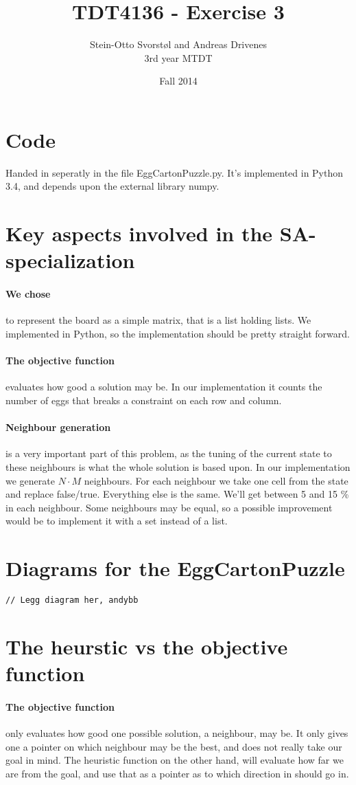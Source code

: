 \documentclass[11pt,a4paper]{article}
\author{Stein-Otto Svorstøl and Andreas Drivenes
\\3rd year MTDT}
\title{TDT4136 - Exercise 3}
\date{Fall 2014}
\begin{document}
\maketitle
\section{Code}
Handed in seperatly in the file EggCartonPuzzle.py. It's implemented in Python 3.4, and depends upon the external library numpy.

\section{Key aspects involved in the SA-specialization}
\paragraph{We chose} to represent the board as a simple matrix, that is a list holding lists. We implemented in Python, so the implementation should be pretty straight forward.

\paragraph{The objective function} evaluates how good a solution may be. In our implementation it counts the number of eggs that breaks a constraint on each row and column.

\paragraph{Neighbour generation} is a very important part of this problem, as the tuning of the current state to these neighbours is what the whole solution is based upon. In our implementation we generate \begin{math}N\cdot M\end{math} neighbours. For each neighbour we take one cell from the state and replace false/true. Everything else is the same. We'll get between 5 and 15 \% in each neighbour. Some neighbours may be equal, so a possible improvement would be to implement it with a set instead of a list.
\section{Diagrams for the EggCartonPuzzle}
\begin{lstlisting}
// Legg diagram her, andybb
\end{lstlisting}

\section{The heurstic vs the objective function}
\paragraph{The objective function} only evaluates how good one possible solution, a neighbour, may be. It only gives one a pointer on which neighbour may be the best, and does not really take our goal in mind. The heuristic function on the other hand, will evaluate how far we are from the goal, and use that as a pointer as to which direction in should go in. 
\end{document}
